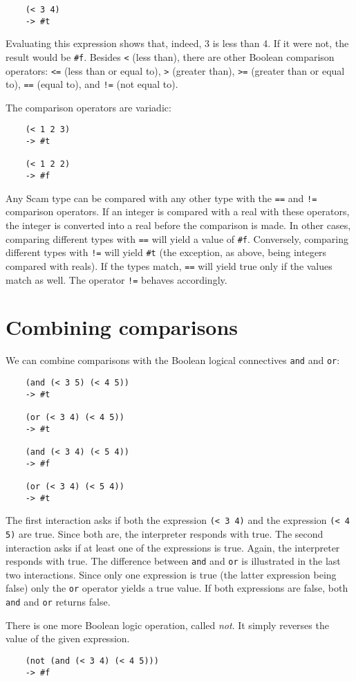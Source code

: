\begin{verbatim}
    (< 3 4)
    -> #t
\end{verbatim}

Evaluating this expression shows that, indeed, 3 is less than 4. If it were
not, the result would be {\tt \#f}.
Besides
{\tt <}
(less than),
there are other {\sc Boolean} comparison operators:
{\tt <=}
(less than or equal to),
{\tt >}
(greater than),
{\tt >=}
(greater than or equal to),
{\tt ==}
(equal to), and
{\tt !=}
(not equal to).

The comparison operators are variadic:

\begin{verbatim}
    (< 1 2 3)
    -> #t

    (< 1 2 2)
    -> #f
\end{verbatim}

Any Scam type can be compared with any other type with the
{\tt ==}
and
{\tt !=}
comparison operators.
If an integer is compared with a real with these
operators, the integer is converted into a real before the comparison
is made. In other cases, comparing different types with
{\tt ==}
will yield
a value of {\tt \#f}. Conversely, comparing different types with
{\tt !=}
will yield
{\tt \#t}
(the exception, as above, being integers compared with reals).
If the types match,
{\tt ==}
will yield true only if the values
match as well. The operator
{\tt !=}
behaves accordingly.

\section{Combining comparisons}

We can combine comparisons with the {\sc Boolean} logical connectives
{\tt and} and {\tt or}:

\begin{verbatim}
    (and (< 3 5) (< 4 5))
    -> #t
    
    (or (< 3 4) (< 4 5))
    -> #t
    
    (and (< 3 4) (< 5 4))
    -> #f
    
    (or (< 3 4) (< 5 4))
    -> #t
\end{verbatim}

The first interaction asks if both the expression
{\tt (< 3 4)} and the expression
{\tt (< 4 5)} are true. Since both are, the
interpreter responds with true. The second interaction
asks if at least one of the expressions is true. Again, the
interpreter responds with true. The difference between {\tt and}
and {\tt or} is illustrated in the last two interactions. Since
only one expression is true (the latter expression being
false) only the {\tt or} operator yields a true value.
If both expressions are false, both \verb!and! and \verb!or! returns false.

There is one more {\sc Boolean} logic operation, called
{\it not}. It simply reverses the value of the given expression.

\begin{verbatim}
    (not (and (< 3 4) (< 4 5)))
    -> #f
\end{verbatim}
